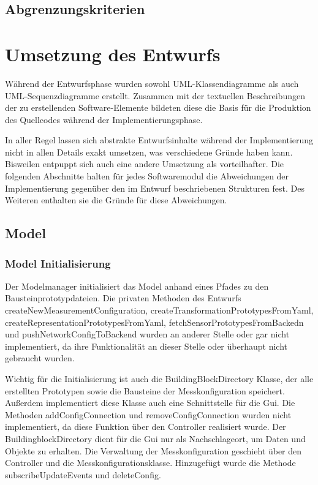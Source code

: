 \documentclass[parskip=full]{scrartcl}
\begin{document}
\subsection{Abgrenzungskriterien}

\clearpage
\section{Umsetzung des Entwurfs}

Während der Entwurfsphase wurden sowohl UML-Klassendiagramme als auch UML-Sequenzdiagramme erstellt. Zusammen mit der textuellen Beschreibungen der zu erstellenden Software-Elemente bildeten diese die Basis für die Produktion des Quellcodes während der Implementierungsphase. 

In aller Regel lassen sich abstrakte Entwurfsinhalte während der Implementierung nicht in allen Details exakt umsetzen, was verschiedene Gründe haben kann. Bisweilen entpuppt sich auch eine andere Umsetzung als vorteilhafter. Die folgenden Abschnitte halten für jedes Softwaremodul die Abweichungen der Implementierung gegenüber den im Entwurf beschriebenen Strukturen fest. Des Weiteren enthalten sie die Gründe für diese Abweichungen. 
\clearpage

\subsection{Model}

\subsubsection{Model Initialisierung}
Der Modelmanager initialisiert das Model anhand eines Pfades zu den Bausteinprototypdateien. Die privaten Methoden des Entwurfs createNewMeasurementConfiguration, createTransformationPrototypesFromYaml, createRepresentationPrototypesFromYaml, fetchSensorPrototypesFromBackedn und pushNetworkConfigToBackend wurden an anderer Stelle oder gar nicht implementiert, da ihre Funktionalität an dieser Stelle oder überhaupt nicht gebraucht wurden.

Wichtig für die Initialisierung ist auch die BuildingBlockDirectory Klasse, der alle erstellten Prototypen sowie die Bausteine der Messkonfiguration speichert. Außerdem implementiert diese Klasse auch eine Schnittstelle für die Gui. Die Methoden addConfigConnection und removeConfigConnection wurden nicht implementiert, da diese Funktion über den Controller realisiert wurde. Der BuildingblockDirectory dient für die Gui nur als Nachschlageort, um Daten und Objekte zu erhalten. Die Verwaltung der Messkonfiguration geschieht über den Controller und die Messkonfigurationsklasse. Hinzugefügt wurde die Methode subscribeUpdateEvents und deleteConfig.
\end{document}
